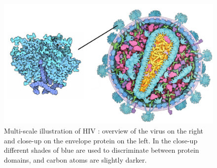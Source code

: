 \documentclass{egpubl}
\begin{document}
	\begin{figure}
		\centering
		\includegraphics[width=1\linewidth]{Figures/motivation}
		\caption{Multi-scale illustration of HIV \cite{RCSBPDB2011}: overview of the virus on the right and close-up on the envelope protein on the left. In the close-up different shades of blue are used to discriminate between protein domains, and carbon atoms are slightly darker. }
		\label{fig:motivation}
	\end{figure}
	
		
\end{document}
